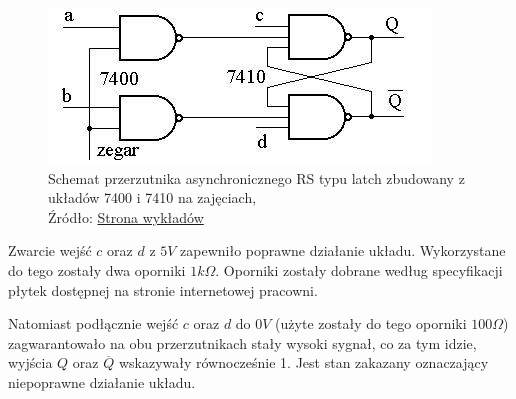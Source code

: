 \documentclass{article}
\begin{document}
        \begin{figure}[!ht]
          \centering
          \includegraphics[scale=0.55]{grafiki/RS_sync_zajecia.jpg}
          \caption{Schemat przerzutnika asynchronicznego RS typu latch zbudowany z układów 7400 i 7410 na zajęciach,
          \\Źródło: \href{https://spe.if.uj.edu.pl/literatura}{Strona wykładów}}
        \end{figure}
        \pagebreak
        
        Zwarcie wejść $c$ oraz $d$ z $5V$ zapewniło poprawne działanie układu. Wykorzystane do tego zostały dwa oporniki $1k\Omega$. Oporniki zostały dobrane według specyfikacji płytek dostępnej na stronie internetowej pracowni.


        Natomiast podłącznie wejść $c$ oraz $d$ do $0V$ (użyte zostały do tego oporniki $100\Omega$) zagwarantowało na obu przerzutnikach stały wysoki sygnał, co za tym idzie, wyjścia $Q$ oraz $\overline{Q}$ wskazywały równocześnie 1. Jest stan zakazany oznaczający niepoprawne działanie układu.
\end{document}
